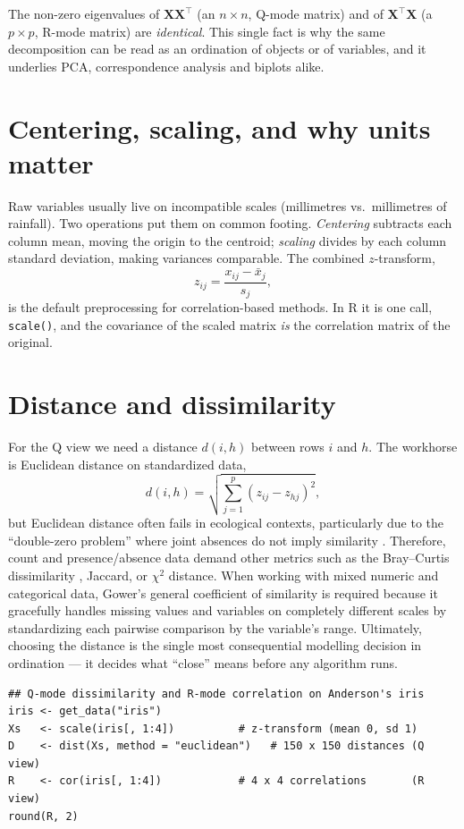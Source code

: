 \documentclass[11pt,oneside]{book}
\newcommand{\code}[1]{\texttt{#1}}
\newcommand{\R}{\textsf{R}}
\begin{document}
\begin{keybox}
The non-zero eigenvalues of $\mathbf{X}\mathbf{X}^{\!\top}$ (an $n\times n$, Q-mode matrix)
and of $\mathbf{X}^{\!\top}\mathbf{X}$ (a $p\times p$, R-mode matrix) are \emph{identical}.
This single fact is why the same decomposition can be read as an ordination of objects or
of variables, and it underlies PCA, correspondence analysis and biplots alike.
\end{keybox}

\section{Centering, scaling, and why units matter}
Raw variables usually live on incompatible scales (millimetres vs.\ millimetres of
rainfall). Two operations put them on common footing. \emph{Centering} subtracts each
column mean, moving the origin to the centroid; \emph{scaling} divides by each column
standard deviation, making variances comparable. The combined $z$-transform,
\[
  z_{ij}=\frac{x_{ij}-\bar x_j}{s_j},
\]
is the default preprocessing for correlation-based methods. In \R{} it is one call,
\code{scale()}, and the covariance of the scaled matrix \emph{is} the correlation matrix
of the original.

\section{Distance and dissimilarity}
For the Q view we need a distance $d(i,h)$ between rows $i$ and $h$. The workhorse is
Euclidean distance on standardized data,
\[
  d(i,h)=\sqrt{\textstyle\sum_{j=1}^{p}(z_{ij}-z_{hj})^2},
\]
but Euclidean distance often fails in ecological contexts, particularly due to the ``double-zero problem'' where joint absences do not imply similarity \cite{Legendre_2012}. Therefore, count and presence/absence data demand other metrics such as the Bray--Curtis dissimilarity \cite{Bray_1957}, Jaccard, or $\chi^2$ distance. When working with mixed numeric and categorical data, Gower's general coefficient of similarity \cite{Gower_1971} is required because it gracefully handles missing values and variables on completely different scales by standardizing each pairwise comparison by the variable's range. Ultimately, choosing the distance is the single most consequential modelling decision in ordination — it decides what ``close'' means before any algorithm runs.

\begin{lstlisting}
## Q-mode dissimilarity and R-mode correlation on Anderson's iris
iris <- get_data("iris")
Xs   <- scale(iris[, 1:4])          # z-transform (mean 0, sd 1)
D    <- dist(Xs, method = "euclidean")   # 150 x 150 distances (Q view)
R    <- cor(iris[, 1:4])            # 4 x 4 correlations       (R view)
round(R, 2)
\end{lstlisting}
\end{document}

